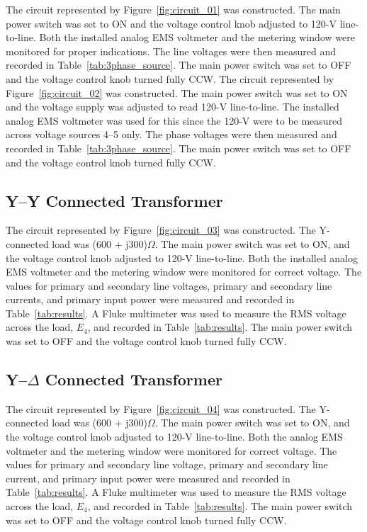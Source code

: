 \documentclass{article}
\begin{document}
\label{part1} The circuit represented by Figure~\ref{fig:circuit_01} was
constructed.  The main power switch was set to ON and the voltage control knob
adjusted to 120-V line-to-line. Both the installed analog EMS voltmeter and the
metering window were monitored for proper indications. The line voltages were
then measured and recorded in Table~\ref{tab:3phase_source}. The main power
switch was set to OFF and the voltage control knob turned fully {CCW}. The
circuit represented by Figure~\ref{fig:circuit_02} was constructed. The main
power switch was set to ON and the voltage supply was adjusted to read 120-V
line-to-line. The installed analog EMS voltmeter was used for this since the
120-V were to be measured across voltage sources 4--5 only. The phase voltages
were then measured and recorded in Table~\ref{tab:3phase_source}.  The main
power switch was set to OFF and the voltage control knob turned fully {CCW}.

\subsection{Y--Y Connected Transformer}

\label{part2} The circuit represented by Figure~\ref{fig:circuit_03} was
constructed.  The Y-connected load was (600 + j300)$\Omega$. The main power
switch was set to ON, and the voltage control knob adjusted to 120-V
line-to-line. Both the installed analog EMS voltmeter and the metering window
were monitored for correct voltage.  The values for primary and secondary line
voltages, primary and secondary line currents, and primary input power were
measured and recorded in Table~\ref{tab:results}. A Fluke multimeter was used
to measure the RMS voltage across the load, $E_4$, and recorded in
Table~\ref{tab:results}.  The main power switch was set to OFF and the voltage
control knob turned fully {CCW}.

\subsection{Y--$\Delta$ Connected Transformer}

\label{part3} The circuit represented by Figure~\ref{fig:circuit_04} was
constructed.  The Y-connected load was (600 + j300)$\Omega$. The main power
switch was set to ON, and the voltage control knob adjusted to 120-V
line-to-line. Both the analog EMS voltmeter and the metering window were
monitored for correct voltage. The values for primary and secondary line
voltage, primary and secondary line current, and primary input power were
measured and recorded in Table~\ref{tab:results}. A Fluke multimeter was used
to measure the RMS voltage across the load, $E_4$, and recorded in
Table~\ref{tab:results}.  The main power switch was set to OFF and the voltage
control knob turned fully {CCW}.
\end{document}
